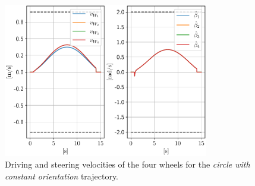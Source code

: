 \begin{figure}
    \centering
    \includegraphics[width=0.8\textwidth]{figures/SWMR/simulations/circular_with_constant_orientation/wheels_velocities.pdf}
    \caption{Driving and steering velocities of the four wheels for the \textit{circle with constant orientation} trajectory.}
    \label{fig:simulations:circle-with-constant-orientation:wheel-velocities}
\end{figure}

